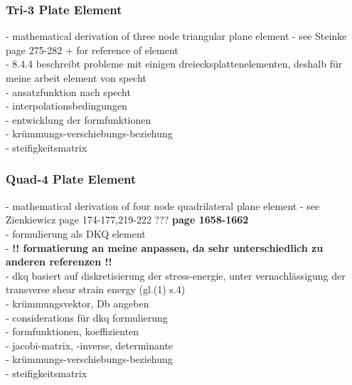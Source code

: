 \documentclass[11pt,twoside]{scrartcl}
\begin{document}
  \subsubsection{Tri-3 Plate Element} \cite{steinke2005finite}\cite{specht1988modified}
  - mathematical derivation of three node triangular plane element\newline
  - see Steinke \cite{steinke2005finite} page 275-282 + \cite{specht1988modified} for reference of element\\
  - 8.4.4 beschreibt probleme mit einigen dreiecksplattenelementen, deshalb für meine arbeit element von specht \cite{specht1988modified}\\
  - ansatzfunktion nach specht\\
  - interpolationsbedingungen\\
  - entwicklung der formfunktionen\\
  - krümmungs-verschiebungs-beziehung\\
  - steifigkeitsmatrix
  \subsubsection{Quad-4 Plate Element}
  - mathematical derivation of four node quadrilateral plane element\newline
  - see Zienkiewicz \cite{zienkiewicz2000finite} page 174-177,219-222  \cite{zienkiewicz1977fem} ???  \textbf{\cite{batoz1982evaluation} page 1658-1662}\\
  - formulierung als DKQ element\\
  - \textbf{!! formatierung an meine anpassen, da sehr unterschiedlich zu anderen referenzen !!}\\
  - dkq basiert auf diskretisierung der stress-energie, unter vernachlässigung der transverse shear strain energy (gl.(1) s.4)\\
  - krümmungsvektor, Db angeben\\
  - considerations für dkq formulierung\\
  - formfunktionen, koeffizienten\\
  - jacobi-matrix, -inverse, determinante\\
  - krümmungs-verschiebungs-beziehung\\
  - steifigkeitsmatrix
\end{document}
